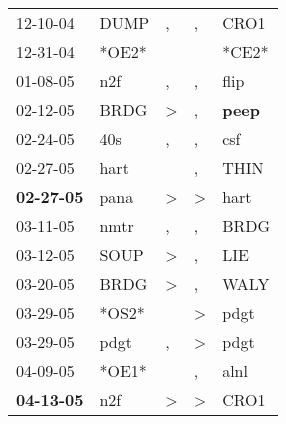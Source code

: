\begin{supertabular}{p{0.07\textwidth}p{0.06\textwidth}p{0.02\textwidth}p{0.02\textwidth}p{0.06\textwidth}}
          12-10-04\textsuperscript{} &           DUMP\textsuperscript{} &                , &                , &           CRO1\textsuperscript{} \\
          12-31-04\textsuperscript{} &                            *OE2* &                  &                  &                            *CE2* \\
          01-08-05\textsuperscript{} &            n2f\textsuperscript{} &                , &                , &           flip\textsuperscript{} \\
          02-12-05\textsuperscript{} &           BRDG\textsuperscript{} &     \textgreater &                , &  \textbf{peep\textsuperscript{}} \\
          02-24-05\textsuperscript{} &            40s\textsuperscript{} &                , &                , &            csf\textsuperscript{} \\
          02-27-05\textsuperscript{} &           hart\textsuperscript{} &                  &                , &           THIN\textsuperscript{} \\
 \textbf{02-27-05\textsuperscript{}} &           pana\textsuperscript{} &     \textgreater &     \textgreater &           hart\textsuperscript{} \\
          03-11-05\textsuperscript{} &           nmtr\textsuperscript{} &                , &                , &           BRDG\textsuperscript{} \\
          03-12-05\textsuperscript{} &           SOUP\textsuperscript{} &     \textgreater &                , &            LIE\textsuperscript{} \\
          03-20-05\textsuperscript{} &           BRDG\textsuperscript{} &     \textgreater &                , &           WALY\textsuperscript{} \\
          03-29-05\textsuperscript{} &                            *OS2* &                  &     \textgreater &           pdgt\textsuperscript{} \\
          03-29-05\textsuperscript{} &           pdgt\textsuperscript{} &                , &     \textgreater &           pdgt\textsuperscript{} \\
          04-09-05\textsuperscript{} &                            *OE1* &                  &                , &           alnl\textsuperscript{} \\
 \textbf{04-13-05\textsuperscript{}} &            n2f\textsuperscript{} &     \textgreater &     \textgreater &           CRO1\textsuperscript{} \\

\end{supertabular}
